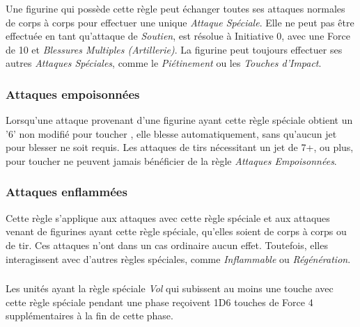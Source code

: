 Une figurine qui possède cette règle peut échanger toutes ses attaques normales de corps à corps pour effectuer une unique \emph{Attaque Spéciale}. Elle ne peut pas être effectuée en tant qu'attaque de \emph{Soutien}, est résolue à Initiative 0, avec une Force de 10 et \emph{Blessures Multiples (Artillerie)}.  La figurine peut toujours effectuer ses autres \emph{Attaques Spéciales}, comme le \emph{Piétinement} ou les \emph{Touches d'Impact}. 

\subsubsection*{Attaques empoisonnées}

Lorsqu'une attaque provenant d'une figurine ayant cette règle spéciale obtient un '6' non modifié pour toucher  , elle blesse automatiquement, sans qu'aucun jet pour blesser ne soit requis. Les attaques de tirs nécessitant un jet de 7+, ou plus, pour toucher ne peuvent jamais bénéficier de la règle \emph{Attaques Empoisonnées}. 

\subsubsection*{Attaques enflammées}

Cette règle s'applique aux attaques avec cette règle spéciale et aux attaques venant de figurines ayant cette règle spéciale, qu'elles soient de corps à corps ou de tir. Ces attaques n'ont dans un cas ordinaire aucun effet. Toutefois, elles interagissent avec d'autres règles spéciales, comme \emph{Inflammable} ou \emph{Régénération}.

\subsubsection*{}

Les unités ayant la règle spéciale \emph{Vol} qui subissent au moins une touche avec cette règle spéciale pendant une phase reçoivent 1D6 touches de Force 4 supplémentaires à la fin de cette phase.

